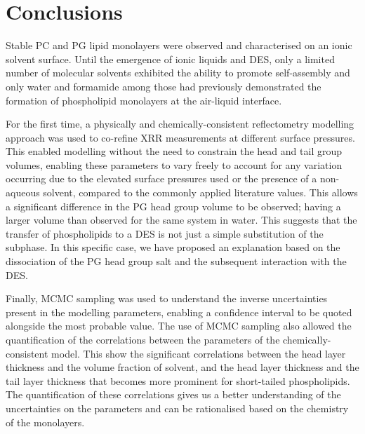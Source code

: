 \section{Conclusions}
Stable PC and PG lipid monolayers were observed and characterised on an ionic solvent surface.
Until the emergence of ionic liquids and DES, only a limited number of molecular solvents exhibited the ability to promote self-assembly and only water and formamide among those had previously demonstrated the formation of phospholipid monolayers at the air-liquid interface.\autocite{mohwald_phospholipid_1990,graner_phospholipidic_1995}

For the first time, a physically and chemically-consistent reflectometry modelling approach was used to co-refine XRR measurements at different surface pressures.
This enabled modelling without the need to constrain the head and tail group volumes, enabling these parameters to vary freely to account for any variation occurring due to the elevated surface pressures used or the presence of a non-aqueous solvent, compared to the commonly applied literature values.
This allows a significant difference in the PG head group volume to be observed; having a larger volume than observed for the same system in water.
This suggests that the transfer of phospholipids to a DES is not just a simple substitution of the subphase.
In this specific case, we have proposed an explanation based on the dissociation of the PG head group salt and the subsequent interaction with the DES.

Finally, MCMC sampling was used to understand the inverse uncertainties present in the modelling parameters, enabling a confidence interval to be quoted alongside the most probable value.
The use of MCMC sampling also allowed the quantification of the correlations between the parameters of the chemically-consistent model.
This show the significant correlations between the head layer thickness and the volume fraction of solvent, and the head layer thickness and the tail layer thickness that becomes more prominent for short-tailed phospholipids.
The quantification of these correlations gives us a better understanding of the uncertainties on the parameters and can be rationalised based on the chemistry of the monolayers.
